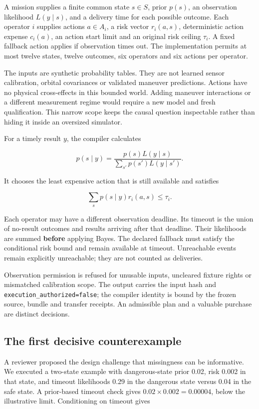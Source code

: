 \documentclass[11pt,letterpaper]{article}
\begin{document}
A mission supplies a finite common state \(s\in S\), prior \(p(s)\), an
observation likelihood \(L(y\mid s)\), and a delivery time for each
possible outcome. Each operator \(i\) supplies actions \(a\in A_i\), a
risk vector \(r_i(a,s)\), deterministic action expense \(c_i(a)\), an
action start limit and an original risk ceiling \(\tau_i\). A fixed
fallback action applies if observation times out. The implementation
permits at most twelve states, twelve outcomes, six operators and six
actions per operator.

The inputs are synthetic probability tables. They are not learned sensor
calibration, orbital covariances or validated maneuver predictions.
Actions have no physical cross-effects in this bounded world. Adding
maneuver interactions or a different measurement regime would require a
new model and fresh qualification. This narrow scope keeps the causal
question inspectable rather than hiding it inside an oversized
simulator.

For a timely result \(y\), the compiler calculates

\[
p(s\mid y)=\frac{p(s)L(y\mid s)}{\sum_{s'}p(s')L(y\mid s')}.
\]

It chooses the least expensive action that is still available and
satisfies

\[
\sum_s p(s\mid y)r_i(a,s)\leq\tau_i.
\]

Each operator may have a different observation deadline. Its timeout is
the union of no-result outcomes and results arriving after that
deadline. Their likelihoods are summed \textbf{before} applying Bayes.
The declared fallback must satisfy the conditional risk bound and remain
available at timeout. Unreachable events remain explicitly unreachable;
they are not counted as deliveries.

Observation permission is refused for unusable inputs, uncleared fixture
rights or mismatched calibration scope. The output carries the input
hash and \texttt{execution\_authorized=false}; the compiler identity is
bound by the frozen source, bundle and transfer receipts. An admissible
plan and a valuable purchase are distinct decisions.

\hypertarget{the-first-decisive-counterexample}{%
\subsection{The first decisive
counterexample}\label{the-first-decisive-counterexample}}

A reviewer proposed the design challenge that missingness can be
informative. We executed a two-state example with dangerous-state prior
0.02, risk 0.002 in that state, and timeout likelihoods 0.29 in the
dangerous state versus 0.04 in the safe state. A prior-based timeout
check gives \(0.02\times0.002=0.00004\), below the illustrative limit.
Conditioning on timeout gives
\end{document}
